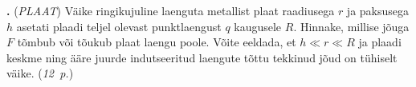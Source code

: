 \documentclass[11pt,a5paper]{article}
\newcommand{\numb}[1]{\vspace{5pt}\textbf{\large #1}}
\newcommand{\nimi}[1]{(\textsl{\small #1})}
\newcommand{\punktid}[1]{(\emph{#1~p.})}
\newcounter{ylesanne}
\newcommand{\yl}[1]{\addtocounter{ylesanne}{1}\numb{\theylesanne.} \nimi{#1} \newblock{}}
\newcommand{\autor}[1]{}%
\begin{document}
\yl{PLAAT}
Väike ringikujuline laenguta metallist plaat raadiusega $r$ ja paksusega $h$ asetati plaadi teljel olevast punktlaengust $q$ kaugusele $R$. Hinnake, millise jõuga $F$ tõmbub või tõukub plaat laengu poole. Võite eeldada, et $h\ll r\ll R$ ja plaadi keskme ning ääre juurde indutseeritud laengute tõttu tekkinud jõud on tühiselt väike. 
\punktid{12} \autor{Konstantin Dukats}
\end{document}

